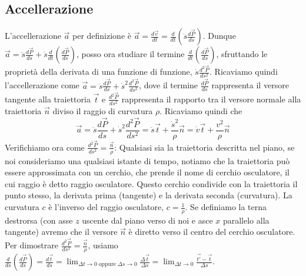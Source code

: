 \subsection{Accellerazione}
L'accellerazione $\vec{a}$ per definizione è $\vec{a} = \frac{d \vec{v}}{dt} = \frac{d}{dt}(\dot{s} \frac{d \vec{P}}{ds})$.\newline
Dunque $\vec{a} = \ddot{s} \frac{d \vec{P}}{ds} + \dot{s} \frac{d}{dt}\left(\frac{d \vec{P}}{ds}\right)$, posso ora studiare il termine $\frac{d}{dt}\left(\frac{d \vec{P}}{ds}\right)$, sfruttando le proprietà della derivata di una funzione di funzione, $\dot{s} \frac{d^2 \vec{P}}{ds^2}$.\newline
Ricaviamo quindi l'accellerazione come $\vec{a} = \ddot{s} \frac{d \vec{P}}{ds} + \dot{s}^2 \frac{d^2 \vec{P}}{ ds^2}$, dove il termine $\frac{d \vec{P}}{ds}$ rappresenta il versore tangente alla traiettoria $\vec{t}$ e $\frac{d^2 \vec{P}}{ ds^2}$ rappresenta il rapporto tra il versore normale alla traiettoria $\vec{n}$ diviso il raggio di curvatura $\rho$. Ricaviamo quindi che
\[
    \vec{a} = \ddot{s} \frac{d \vec{P}}{ds} + \dot{s}^2 \frac{d^2 \vec{P}}{ ds^2} = \ddot{s} \vec{t} + \frac{ \dot{s}^2}{\rho}\vec{n} = \dot{v} \vec{t} + \frac{v^2}{\rho}\vec{n}
\]
Verifichiamo ora come $\frac{d^2 \vec{P}}{ds^2} = \frac{\vec{n}}{\rho}$:\newline
Qualsiasi sia la traiettoria descritta nel piano, se noi consideriamo una qualsiasi istante di tempo, notiamo che la traiettoria può essere approssimata con un cerchio, che prende il nome di cerchio osculatore, il cui raggio è detto raggio osculatore.\newline
Questo cerchio condivide con la traiettoria il punto stesso, la derivata prima (tangente) e la derivata seconda (curvatura). La curvatura $c$ è l'inverso del raggio osculatore, $c = \frac{1}{\rho}$. Se definiamo la terna destrorsa (con asse $z$ uscente dal piano verso di noi e asce $x$ parallelo alla tangente) avremo che il versore $\vec{n}$ è diretto verso il centro del cerchio osculatore.\newline
Per dimostrare $\frac{d^2 \vec{P}}{ds^2} = \frac{\vec{n}}{\rho}$, usiamo $\frac{d}{ds} \left(\frac{d \vec{P}}{ds}\right) = \frac{d \vec{t}}{ds} = \lim_{\Delta t\rightarrow 0 \;\text{oppure}\;\Delta s \rightarrow 0} \frac{\Delta \vec{t}}{\Delta s} = \lim_{\Delta t\rightarrow 0} \frac{\vec{t'}- \vec{t}}{\Delta s}$.\newline
